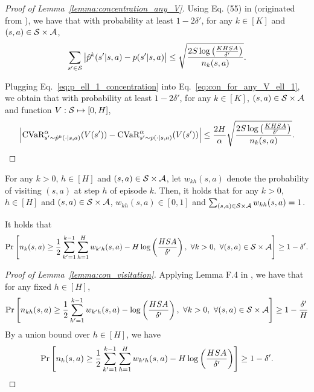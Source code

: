 \begin{proof}[Proof of Lemma~\ref{lemma:concentration_any_V}]
	Using Eq. (55) in \citep{zanette2019tighter} (originated from \citep{weissman2003inequalities}), we have that with probability at least $1-2\delta'$, for any $k \in [K]$ and $(s,a) \in \mathcal{S} \times \mathcal{A}$,
	\begin{align}
		\sum_{s' \in \mathcal{S}} \left| \hat{p}^{k}(s'|s,a)-p(s'|s,a) \right| \leq  \sqrt{\frac{2S\log \left( \frac{KHSA}{\delta'} \right)}{n_k(s,a)}} . \label{eq:p_ell_1_concentration}
	\end{align}
	
	
	
	Plugging Eq.~\eqref{eq:p_ell_1_concentration} into Eq.~\eqref{eq:con_for_any_V_ell_1}, we obtain that with probability at least $1-2\delta'$, for any $k \in [K]$, $(s,a) \in \mathcal{S} \times \mathcal{A}$ and function $V:\mathcal{S} \mapsto [0,H]$, 
	\begin{align*}
		\left| \textup{CVaR}^{\alpha}_{s' \sim \hat{p}^k(\cdot|s,a)}(V(s')) - \textup{CVaR}^{\alpha}_{s' \sim p(\cdot|s,a)}(V(s')) \right| \leq \frac{2H}{\alpha}\sqrt{\frac{2S\log \left( \frac{KHSA}{\delta'} \right)}{n_k(s,a)}} .
	\end{align*}
	
\end{proof}




For any $k>0$, $h \in [H]$ and $(s,a) \in \mathcal{S} \times \mathcal{A}$, let $w_{kh}(s,a)$ denote the probability of visiting $(s,a)$ at step $h$ of episode $k$. Then, it holds that for any $k>0$, $h \in [H]$ and $(s,a) \in \mathcal{S} \times \mathcal{A}$, $w_{kh}(s,a) \in [0,1]$ and $\sum_{(s,a)\in \mathcal{S} \times \mathcal{A}} w_{kh}(s,a)=1$.

\begin{lemma}\label{lemma:con_visitation}
	It holds that
	\begin{align*}
		\Pr \Bigg[  n_k(s,a) \geq \frac{1}{2} \sum_{k'=1}^{k-1} \sum_{h=1}^{H} w_{k'h}(s,a) - H \log \left( \frac{HSA}{\delta'} \right) ,
		\ \forall k>0,\ \forall (s,a) \in \mathcal{S} \times \mathcal{A}
		\Bigg] \geq 1-\delta' .
	\end{align*}
\end{lemma}
\begin{proof}[Proof of Lemma~\ref{lemma:con_visitation}]
	Applying Lemma F.4 in \citep{dann2017unifying}, we have that for any fixed $h \in [H]$,
	\begin{align*}
		\Pr \mbr{ n_{kh}(s,a) \geq \frac{1}{2} \sum_{k'=1}^{k-1} w_{k'h}(s,a) - \log \sbr{\frac{HSA}{\delta'}} , \ \forall k>0,\ \forall (s,a) \in \cS \times \cA } \geq 1-\frac{\delta'}{H}
	\end{align*}
	By a union bound over $h \in [H]$, we have
	\begin{align*}
		\Pr \left[  n_{k}(s,a) \geq \frac{1}{2} \sum_{k'=1}^{k-1} \sum_{h=1}^{H} w_{k'h}(s,a) - H \log \left( \frac{HSA}{\delta'} \right)  \right] \geq 1-\delta' .
	\end{align*}
\end{proof}

